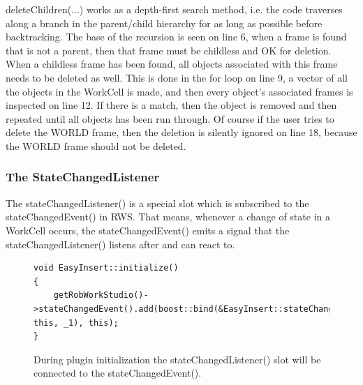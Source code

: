 deleteChildren(...) works as a depth-first search method, i.e. the code traverses along a branch in the parent/child hierarchy for as long as possible before backtracking. The base of the recursion is seen on line 6, when a frame is found that is not a parent, then that frame must be childless and OK for deletion.
When a childless frame has been found, all objects associated with this frame needs to be deleted as well. This is done in the for loop on line 9, a vector of all the objects in the WorkCell is made, and then every object's associated frames is inspected on line 12. If there is a match, then the object is removed and then repeated until all objects has been run through. Of course if the user tries to delete the WORLD frame, then the deletion is silently ignored on line 18, because the WORLD frame should not be deleted.

\subsubsection{The StateChangedListener}
\label{sec:eiStateChangedListener}

The stateChangedListener() is a special slot which is subscribed to the stateChangedEvent() in RWS. That means, whenever a change of state in a WorkCell occurs, the stateChangedEvent() emits a signal that the stateChangedListener() listens after and can react to. 

\begin{figure}[h] %
\centering
\lstset{language=C++} 
\begin{lstlisting}[frame=single] 
void EasyInsert::initialize()
{
    getRobWorkStudio()->stateChangedEvent().add(boost::bind(&EasyInsert::stateChangedListener, this, _1), this);
}
\end{lstlisting}
\caption{During plugin initialization the stateChangedListener() slot will be connected to the stateChangedEvent().}
\label{fig:eiStateChangedListener} 	
\end{figure}

